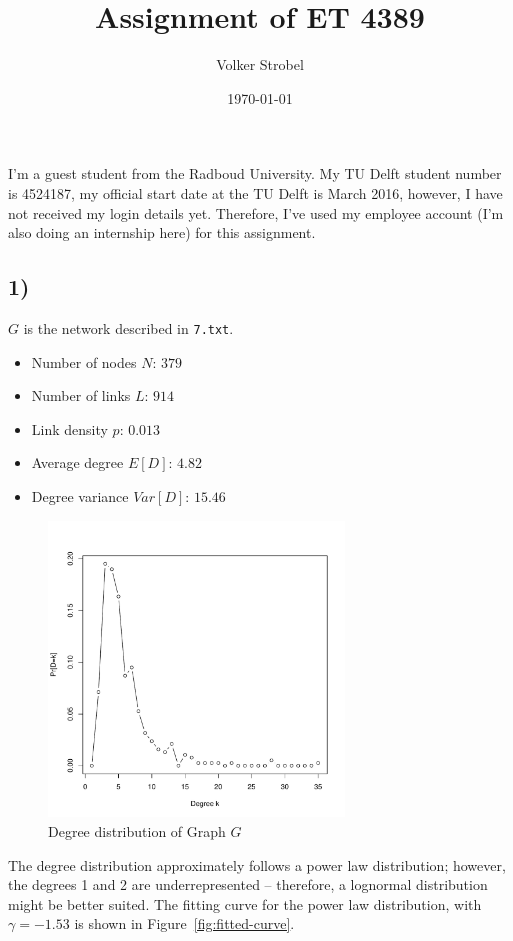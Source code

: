 \documentclass{article}
\title{Assignment of ET 4389}
\author{Volker Strobel}
\date{\today}
\begin{document}
\maketitle

I'm a guest student from the Radboud University. My TU Delft student
number is 4524187, my official start date at the TU Delft is March
2016, however, I have not received my login details yet. Therefore,
I've used my employee account (I'm also doing an internship here) for
this assignment.

\subsection*{1)}
$G$ is the network described in \texttt{7.txt}.

\begin{itemize}
  \item Number of nodes $N$: $379$ 
  \item Number of links $L$: $914$
  \item Link density $p$: $0.013$
  \item Average degree $E[D]$: $4.82$
  \item Degree variance $Var[D]$: $15.46$
\end{itemize}

\begin{figure}[H]
  \centering
  \includegraphics[width=0.7\textwidth]{degree_distribution}
  \caption{Degree distribution of Graph $G$}
\end{figure}

The degree distribution approximately follows a power law
distribution; however, the degrees 1 and 2 are underrepresented --
therefore, a lognormal distribution might be better suited. The
fitting curve for the power law distribution, with $\gamma = - 1.53$
is shown in Figure~\ref{fig:fitted-curve}.
\end{document}
